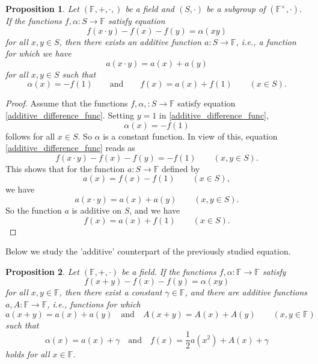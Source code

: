 \documentclass[a4paper,12pt]{article}
\theoremstyle{plain}
\newtheorem{prop}{Proposition}
\theoremstyle{definition}
\theoremstyle{remark}
\begin{document}
\begin{prop}\label{prop2}
  Let  $(\mathbb{F},+, \cdot, )$ be a field and $(S, \cdot)$ be a subgroup of $(\mathbb{F}^{\times}, \cdot)$.  If the functions $f, \alpha\colon S\to \mathbb{F}$ satisfy equation 
 \begin{equation}\label{additive_difference_func}
  f(x\cdot y)-f(x)-f(y)= \alpha(xy)
 \end{equation}
for all $x, y\in S$, then there exists an additive function $a\colon S\to \mathbb{F}$, i.e., a function for which we have     
\[
 a(x \cdot y)= a(x)+a(y)
\]
for all $x, y\in S$ such that 
\[
 \alpha(x)= -f(1) 
 \qquad 
 \text{and}
 \qquad 
 f(x)= a(x)+f(1) 
 \qquad 
 \left(x\in S\right). 
\]
\end{prop}

\begin{proof}
 Assume that the functions $f, \alpha, \colon S\to \mathbb{F}$ satisfy equation \eqref{additive_difference_func}. 
 Setting $y=1$ in \eqref{additive_difference_func}, 
 \[
 \alpha(x)= -f(1)
 \]
 follows for all $x\in S$. So $\alpha$ is a constant function. 
 In view of this, equation \eqref{additive_difference_func} reads as 
 \[
 f(x \cdot y)-f(x)-f(y)= -f(1)
 \qquad 
 \left(x, y\in S\right). 
 \]
 This shows that for the function $a\colon S\to \mathbb{F}$ defined by 
 \[
 a(x)= f(x)-f(1)
 \qquad 
 \left(x\in S\right), 
 \]
 we have 
 \[
 a(x\cdot y)= a(x)+a(y)
 \qquad 
 \left(x, y\in S\right). 
 \]
 So the function $a$ is additive on $S$, and we have 
 \[
 f(x)= a(x)+f(1)
 \qquad 
 \left(x\in S\right). 
 \]
\end{proof}

Below we study the 'additive' counterpart of the previously studied equation. 

\begin{prop}\label{prop3}
 Let $(\mathbb{F}, +, \cdot)$ be a field. If the functions $f, \alpha \colon \mathbb{F}\to \mathbb{F}$ satisfy 
 \begin{equation}\label{add_product}
  f(x+y)-f(x)-f(y)= \alpha(xy)
 \end{equation}
for all $x, y\in \mathbb{F}$, then there exist a constant $\gamma\in \mathbb{F}$, and there are additive functions $a, A\colon \mathbb{F}\to \mathbb{F}$, i.e., functions for which 
\[
 a(x+y)= a(x)+a(y) 
 \quad 
 \text{and}
 \quad 
 A(x+y)= A(x)+A(y) 
 \qquad 
 \left(x, y\in \mathbb{F}\right)
\]
such that 
\[
 \alpha(x)= a(x)+\gamma 
 \quad 
 \text{and}
 \quad 
 f(x)= \frac{1}{2}a(x^{2})+A(x)+\gamma
\]
holds for all $x\in \mathbb{F}$. 
\end{prop}
\end{document}
